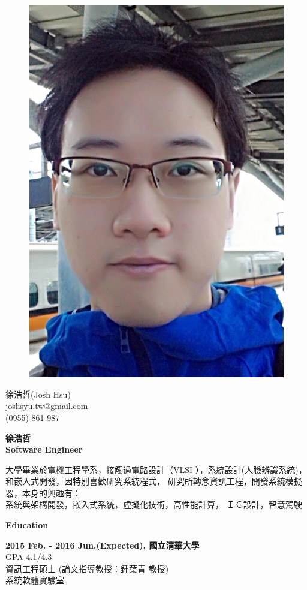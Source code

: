 \documentclass[a4paper,12pt,final]{memoir}
\newcommand{\Sep}{\vspace{1.5em}}
\newcommand{\SmallSep}{\vspace{0.5em}}
\newenvironment{AboutMe}
	{\ignorespaces\textbf{\color{RoyalBlue} About me}}
	{\Sep\ignorespacesafterend}
\newcommand{\CVSection}[1]
	{\Large\textbf{#1}\par
	\SmallSep\normalsize\normalfont}
\newcommand{\CVItem}[1]
	{\textbf{\color{RoyalBlue} #1}}
\begin{document}
\begin{figure}
	\hfill
	\includegraphics[width=0.6\columnwidth]{picture}
	\vspace{-7cm}
\end{figure}

\begin{flushright}\small
	徐浩哲(Josh Hsu) \\
	\footnotesize{\url{joshsyu.tw@gmail.com}}  \\
	(0955) 861-987
\end{flushright}\normalsize
\framebreak


\Huge\bfseries {\color{RoyalBlue} 徐浩哲} \\ %
\Large\bfseries  Software Engineer \\

\normalsize\normalfont

大學畢業於電機工程學系，接觸過電路設計（VLSI ），系統設計(人臉辨識系統)，
和嵌入式開發，因特別喜歡研究系統程式，
研究所轉念資訊工程，開發系統模擬器，本身的興趣有：\\
系統與架構開發，嵌入式系統，虛擬化技術，高性能計算，
ＩＣ設計，智慧駕駛


\CVSection{Education}
\CVItem{2015 Feb. - 2016 Jun.(Expected), 國立清華大學}\\
GPA 4.1/4.3 \\
資訊工程碩士 (論文指導教授：鍾葉青 教授) \\
系統軟體實驗室
\SmallSep
\end{document}
